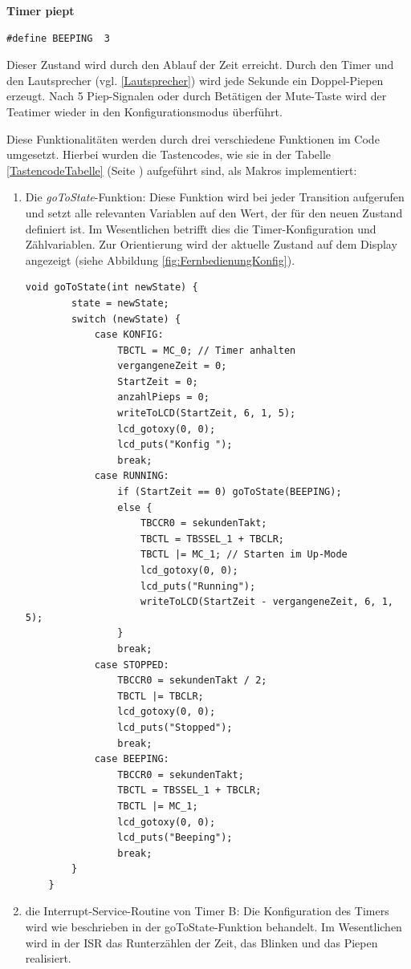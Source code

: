 \documentclass[12pt,a4paper,bibliography=totocnumbered,listof=totocnumbered]{scrartcl}
\begin{document}
\textbf{Timer piept}
\begin{lstlisting}
#define BEEPING  3
\end{lstlisting}
Dieser Zustand wird durch den Ablauf der Zeit erreicht. Durch den Timer und den Lautsprecher (vgl. \ref{Lautsprecher}) wird jede Sekunde ein Doppel-Piepen erzeugt. Nach 5 Piep-Signalen oder durch Betätigen der \glqq Mute\grqq{}-Taste wird der Teatimer wieder in den Konfigurationsmodus überführt.



Diese Funktionalitäten werden durch drei verschiedene Funktionen im Code umgesetzt. Hierbei wurden die Tastencodes, wie sie in der Tabelle \ref{TastencodeTabelle} (Seite \pageref{TastencodeTabelle}) aufgeführt sind, als Makros implementiert:

\begin{enumerate}
	\item Die \textit{goToState}-Funktion: \newline
	Diese Funktion wird bei jeder Transition aufgerufen und setzt alle relevanten Variablen auf den Wert, der für den neuen Zustand definiert ist. Im Wesentlichen betrifft dies die Timer-Konfiguration und Zählvariablen. Zur Orientierung wird der aktuelle Zustand auf dem Display angezeigt (siehe Abbildung \ref{fig:FernbedienungKonfig}).
	
	\vspace{1em}
	\begin{lstlisting}[caption=die goToState-Funktion]
	void goToState(int newState) {
		state = newState;
		switch (newState) {
			case KONFIG:
				TBCTL = MC_0; // Timer anhalten
				vergangeneZeit = 0;
				StartZeit = 0;
				anzahlPieps = 0;
				writeToLCD(StartZeit, 6, 1, 5);
				lcd_gotoxy(0, 0);
				lcd_puts("Konfig ");
				break;
			case RUNNING:
				if (StartZeit == 0) goToState(BEEPING);
				else {
					TBCCR0 = sekundenTakt;
					TBCTL = TBSSEL_1 + TBCLR;
					TBCTL |= MC_1; // Starten im Up-Mode
					lcd_gotoxy(0, 0);
					lcd_puts("Running");
					writeToLCD(StartZeit - vergangeneZeit, 6, 1, 5);
				}
				break;
			case STOPPED:
				TBCCR0 = sekundenTakt / 2;
				TBCTL |= TBCLR;
				lcd_gotoxy(0, 0);
				lcd_puts("Stopped");
				break;
			case BEEPING:
				TBCCR0 = sekundenTakt;
				TBCTL = TBSSEL_1 + TBCLR;
				TBCTL |= MC_1;
				lcd_gotoxy(0, 0);
				lcd_puts("Beeping");
				break;
		}
	}
	\end{lstlisting}
	
	\item die Interrupt-Service-Routine von Timer B: \newline
	Die Konfiguration des Timers wird wie beschrieben in der goToState-Funktion behandelt. Im Wesentlichen wird in der ISR das Runterzählen der Zeit, das Blinken und das Piepen realisiert.
	

\end{enumerate}
\end{document}
